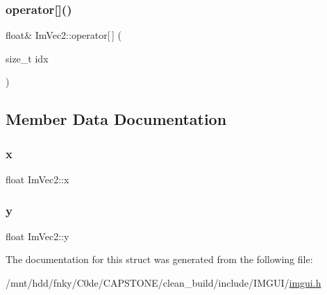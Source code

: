 \mbox{\label{structImVec2_a04b75dbf3885c5cb9fe0da28471e313a}} 
\subsubsection{\texorpdfstring{operator[]()}{operator[]()}\hspace{0.1cm}{\footnotesize\ttfamily [2/2]}}
{\footnotesize\ttfamily float\& Im\+Vec2\+::operator\mbox{[}$\,$\mbox{]} (\begin{DoxyParamCaption}\item[{size\+\_\+t}]{idx }\end{DoxyParamCaption})\hspace{0.3cm}{\ttfamily [inline]}}



\subsection{Member Data Documentation}
\mbox{\label{structImVec2_a5802a68560961ed8cb8cc5fb2a244c2d}} 
\subsubsection{\texorpdfstring{x}{x}}
{\footnotesize\ttfamily float Im\+Vec2\+::x}

\mbox{\label{structImVec2_a1f9d136ca837e147b793b19d25a3a618}} 
\subsubsection{\texorpdfstring{y}{y}}
{\footnotesize\ttfamily float Im\+Vec2\+::y}



The documentation for this struct was generated from the following file\+:\begin{DoxyCompactItemize}
\item 
/mnt/hdd/fnky/\+C0de/\+C\+A\+P\+S\+T\+O\+N\+E/clean\+\_\+build/include/\+I\+M\+G\+U\+I/\hyperlink{imgui_8h}{imgui.\+h}\end{DoxyCompactItemize}
